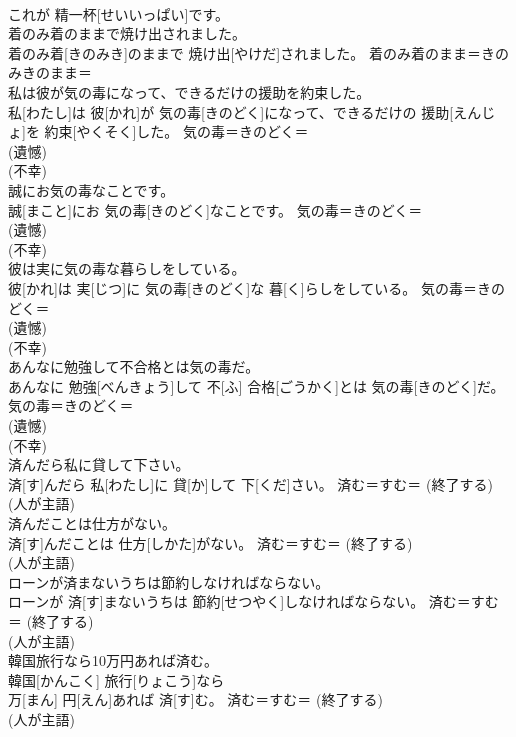 \documentclass[8pt]{extreport}
\begin{document}
\begin{CJK}{UTF8}{min}
{\\	これが 精一杯[せいいっぱい]です。	
\\	着のみ着のままで焼け出されました。	
\\	着のみ着[きのみき]のままで 焼け出[やけだ]されました。	着のみ着のまま＝きのみきのまま＝ 
\\	私は彼が気の毒になって、できるだけの援助を約束した。	
\\	私[わたし]は 彼[かれ]が 気の毒[きのどく]になって、できるだけの 援助[えんじょ]を 約束[やくそく]した。	気の毒＝きのどく＝ 
\\	(遺憾) 
\\	(不幸) 
\\	誠にお気の毒なことです。	
\\	誠[まこと]にお 気の毒[きのどく]なことです。	気の毒＝きのどく＝ 
\\	(遺憾) 
\\	(不幸) 
\\	彼は実に気の毒な暮らしをしている。	
\\	彼[かれ]は 実[じつ]に 気の毒[きのどく]な 暮[く]らしをしている。	気の毒＝きのどく＝ 
\\	(遺憾) 
\\	(不幸) 
\\	あんなに勉強して不合格とは気の毒だ。	
\\	あんなに 勉強[べんきょう]して 不[ふ] 合格[ごうかく]とは 気の毒[きのどく]だ。	気の毒＝きのどく＝ 
\\	(遺憾) 
\\	(不幸) 
\\	済んだら私に貸して下さい。	
\\	済[す]んだら 私[わたし]に 貸[か]して 下[くだ]さい。	済む＝すむ＝ (終了する) 
\\	(人が主語) 
\\	済んだことは仕方がない。	
\\	済[す]んだことは 仕方[しかた]がない。	済む＝すむ＝ (終了する) 
\\	(人が主語) 
\\	ローンが済まないうちは節約しなければならない。	
\\	ローンが 済[す]まないうちは 節約[せつやく]しなければならない。	済む＝すむ＝ (終了する) 
\\	(人が主語) 
\\	韓国旅行なら10万円あれば済む。	
\\	韓国[かんこく] 旅行[りょこう]なら 
\\	万[まん] 円[えん]あれば 済[す]む。	済む＝すむ＝ (終了する) 
\\	(人が主語) 
}
\end{CJK}
\end{document}

